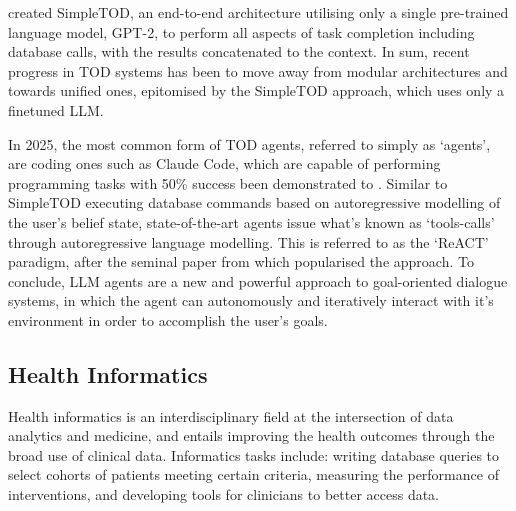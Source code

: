 \documentclass[11pt]{article}
\begin{document}
\citet{hosseini-asl_simple_2022} created SimpleTOD, an end-to-end architecture utilising only a single pre-trained language model, GPT-2, to perform all aspects of task completion including database calls, with the results concatenated to the context.
In sum, recent progress in TOD systems has been to move away from modular architectures and towards unified ones, epitomised by the SimpleTOD approach, which uses only a finetuned LLM. 


In 2025, the most common form of TOD agents, referred to simply as `agents', are coding ones such as Claude Code, which are capable of performing programming tasks with 50\% success 
been demonstrated to \cite{kwa_measuring_2025}.
Similar to SimpleTOD executing database commands based on autoregressive modelling of the user's belief state, state-of-the-art agents issue what's known as `tools-calls' through autoregressive language modelling. This is referred to as the `ReACT' paradigm, after the seminal paper from \citet{yao_reac_2023} which popularised the approach. To conclude, LLM agents are a new and powerful approach to goal-oriented dialogue systems, in which the agent can autonomously and iteratively interact with it's environment in order to accomplish the user's goals.



\subsection{Health Informatics}
Health informatics is an interdisciplinary field at the intersection of data analytics and medicine, and entails improving the health outcomes through the broad use of clinical data. Informatics tasks include: writing database queries to select cohorts of patients meeting certain criteria, measuring the performance of interventions, and developing tools for clinicians to better access data. 
\end{document}
